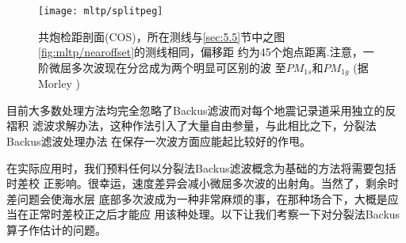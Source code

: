 \begin{figure}[H]
\centering
\texttt{[image: mltp/splitpeg]}
\caption[splitpeg]{
共炮检距剖面(COS)，所在测线与\ref{sec:5.5}节中之图\ref{fig:mltp/nearoffset}的测线相同，偏移距
约为45个炮点距离.注意，一阶微屈多次波现在分岔成为两个明显可区别的波
至$PM_{1s}$和$PM_{1g}$ (据Morley )
}
\label{fig:mltp/splitpeg}
\end{figure}

目前大多数处理方法均完全忽略了Backus滤波而对每个地震记录道采用独立的反褶积
滤波求解办法，这种作法引入了大量自由参量，与此相比之下，分裂法Backus滤波处理办法
在保存一次波方面应能起比较好的作甩。

在实际应用时，我们预料任何以分裂法Backus滤波概念为基础的方法将需要包括时差校
正影响。很幸运，速度差异会减小微屈多次波的出射角。当然了，剩余时差问题会使海水层
底部多次波成为一种非常麻烦的事，在那种场合下，大概是应当在正常时差校正之后才能应
用该种处理。以下让我们考察一下对分裂法Backus算子作估计的问题。




